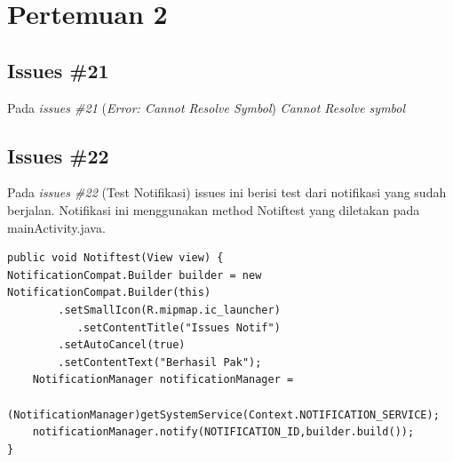 \chapter{Pertemuan 2}


\section{Issues \#21}
Pada \textit{issues \#21} (\textit{Error: Cannot Resolve Symbol}) \textit{Cannot Resolve symbol} 

\section{Issues \#22}
Pada \textit{issues \#22} (Test Notifikasi) issues ini berisi test dari notifikasi yang sudah berjalan. Notifikasi ini menggunakan method Notiftest yang diletakan pada mainActivity.java.
\begin{verbatim}
public void Notiftest(View view) {
NotificationCompat.Builder builder = new NotificationCompat.Builder(this)
        .setSmallIcon(R.mipmap.ic_launcher)
           .setContentTitle("Issues Notif")
        .setAutoCancel(true)
        .setContentText("Berhasil Pak");
    NotificationManager notificationManager = 
    (NotificationManager)getSystemService(Context.NOTIFICATION_SERVICE);
    notificationManager.notify(NOTIFICATION_ID,builder.build());
}
\end{verbatim}

